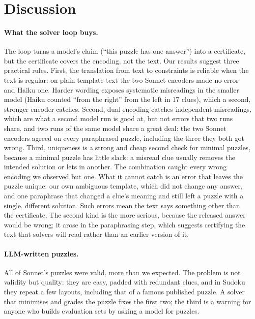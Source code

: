 \section{Discussion}
\label{sec:discussion}

\paragraph{What the solver loop buys.} The loop turns a model's claim (``this puzzle has one answer'') into a certificate, but the certificate covers the encoding, not the text. Our results suggest three practical rules. First, the translation from text to constraints is reliable when the text is regular: on plain template text the two Sonnet encoders made no error and Haiku one. Harder wording exposes systematic misreadings in the smaller model (Haiku counted ``from the right'' from the left in 17 clues), which a second, stronger encoder catches. Second, dual encoding catches independent misreadings, which are what a second model run is good at, but not errors that two runs share, and two runs of the same model share a great deal: the two Sonnet encoders agreed on every paraphrased puzzle, including the three they both got wrong. Third, uniqueness is a strong and cheap second check for minimal puzzles, because a minimal puzzle has little slack: a misread clue usually removes the intended solution or lets in another. The combination caught every wrong encoding we observed but one. What it cannot catch is an error that leaves the puzzle unique: our own ambiguous template, which did not change any answer, and one paraphrase that changed a clue's meaning and still left a puzzle with a single, different solution. Such errors mean the text says something other than the certificate. The second kind is the more serious, because the released answer would be wrong; it arose in the paraphrasing step, which suggests certifying the text that solvers will read rather than an earlier version of it.

\paragraph{LLM-written puzzles.} All of Sonnet's puzzles were valid, more than we expected. The problem is not validity but quality: they are easy, padded with redundant clues, and in Sudoku they repeat a few layouts, including that of a famous published puzzle. A solver that minimises and grades the puzzle fixes the first two; the third is a warning for anyone who builds evaluation sets by asking a model for puzzles.

